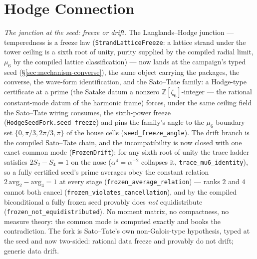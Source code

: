 \documentclass[11pt]{article}
\theoremstyle{definition}
\begin{document}
\section{Hodge Connection}\label{sec:hodge-connection}

\emph{The junction at the seed: freeze or drift.}  The Langlands--Hodge junction
--- temperedness is a freeze law (\texttt{StrandLatticeFreeze}: a lattice strand
under the tower ceiling is a sixth root of unity, purity supplied by the compiled
radial limit, $\mu_6$ by the compiled lattice classification) --- now lands at the
campaign's typed seed (\S\ref{sec:mechanism-converse}), the same object carrying
the packages, the converse, the wave-form identification, and the Sato--Tate
family: a Hodge-type certificate at a prime (the Satake datum a nonzero
$\mathbb Z[\zeta_6]$-integer — the rational constant-mode datum of the harmonic
frame) forces, under the same ceiling field the Sato--Tate wiring consumes, the
sixth-power freeze (\texttt{HodgeSeedFork.seed\_freeze}) and pins the family's
angle to the $\mu_6$ boundary set $\{0,\pi/3,2\pi/3,\pi\}$ of the house cells
(\texttt{seed\_freeze\_angle}).  The drift branch is the compiled Sato--Tate
chain, and the incompatibility is now closed with one exact common mode
(\texttt{FrozenDrift}): for any sixth root of unity the trace ladder satisfies
$2S_2-S_4=1$ on the nose ($\alpha^4=\alpha^{-2}$ collapses it,
\texttt{trace\_mu6\_identity}), so a fully certified seed's prime averages obey
the constant relation $2\,\mathrm{avg}_2-\mathrm{avg}_4=1$ at every stage
(\texttt{frozen\_average\_relation}) --- ranks $2$ and $4$ cannot both cancel
(\texttt{frozen\_violates\_cancellation}), and by the compiled biconditional a
fully frozen seed provably does \emph{not} equidistribute
(\texttt{frozen\_not\_equidistributed}).  No moment matrix, no compactness, no
measure theory: the common mode is computed exactly and books the contradiction.
The fork is Sato--Tate's own non-Galois-type hypothesis, typed at the seed and
now two-sided: rational data freeze and provably do not drift; generic data
drift.
\end{document}
